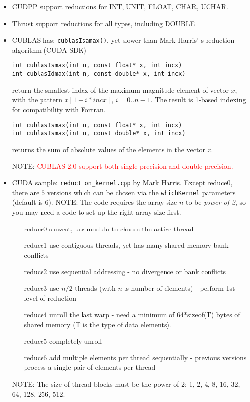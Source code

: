 \begin{itemize}
\item CUDPP support reductions for INT, UNIT, FLOAT, CHAR, UCHAR.

\item Thrust support reductions for all types, including DOUBLE

\item CUBLAS has: \verb!cublasIsamax()!, yet slower than Mark Harris'
  s reduction algorithm (CUDA SDK)
\begin{verbatim}
int cublasIsmax(int n, const float* x, int incx)
int cublasIdmax(int n, const double* x, int incx)
\end{verbatim}
  return the smallest index of the maximum magnitude element of vector
  $x$, with the pattern $x[1+i*incx]$, $i=0..n-1$. The result is
  1-based indexing for compatibility with Fortran.
\begin{verbatim}
int cublasIsmax(int n, const float* x, int incx)
int cublasIsmax(int n, const double* x, int incx)
\end{verbatim}
  returns the sum of absolute values of the elements in the vector
  $x$.

NOTE:
\textcolor{red}{CUBLAS 2.0 support both single-precision and
  double-precision.}

\item CUDA sample: \verb!reduction_kernel.cpp! by Mark Harris. Except
  reduce0, there are 6 versions which can be chosen via the
  \verb!whichKernel!  parameters (default is 6). NOTE: The code
  requires the array size $n$ to be {\it power of 2}, so you may need
  a code to set up the right array size first.
  \begin{enumerate}
  \item [reduce0] slowest, use modulo to choose the active thread
  \item [reduce1] use contiguous threads, yet has many shared
    memory bank conflicts
  \item [reduce2] use sequential addressing - no divergence or bank
    conflicts
  \item [reduce3] use $n/2$ threads (with $n$ is number of elements) -
    perform 1st level of reduction
  \item [reduce4] unroll the last warp - need a minimum of
    64*sizeof(T) bytes of shared memory (T is the type of data
    elements).
  \item [reduce5] completely unroll 
  \item [reduce6] add multiple elements per thread sequentially -
    previous versions process a single pair of elements per thread
  \end{enumerate}

  NOTE: The size of thread blocks must be the power of 2: 1, 2, 4, 8,
  16, 32, 64, 128, 256, 512. 
\end{itemize}


